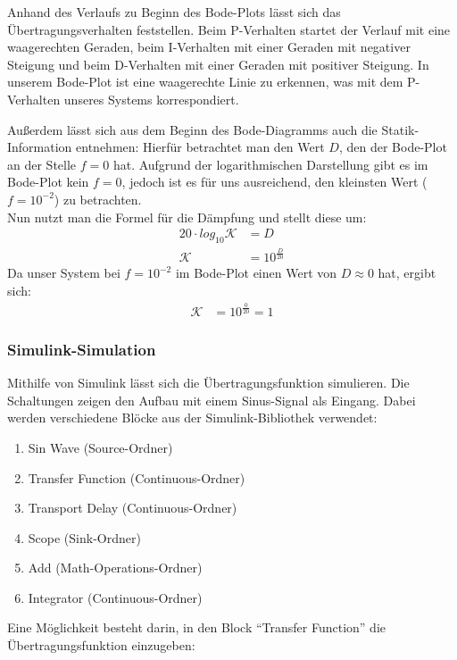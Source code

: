  Anhand des Verlaufs zu Beginn des Bode-Plots lässt sich das Übertragungsverhalten feststellen. Beim P-Verhalten startet der Verlauf mit eine waagerechten Geraden, beim I-Verhalten mit einer Geraden mit negativer Steigung und beim D-Verhalten mit einer Geraden mit positiver Steigung. 
 In unserem Bode-Plot ist eine waagerechte Linie zu erkennen, was mit dem P-Verhalten unseres Systems korrespondiert.

 Außerdem lässt sich aus dem Beginn des Bode-Diagramms auch die Statik-Information entnehmen: Hierfür betrachtet man den Wert $D$, den der Bode-Plot an der Stelle $f = 0$ hat. Aufgrund der logarithmischen Darstellung gibt es im Bode-Plot kein $f = 0$, jedoch ist es für uns ausreichend, den kleinsten Wert ($f = 10^{-2}$) zu betrachten. \\
 Nun nutzt man die Formel für die Dämpfung und stellt diese um:
 \begin{align*}
    20 \cdot log_{10} \mathcal{K} &= D \\
    \mathcal{K} &= 10^{\frac{D}{20}}
 \end{align*}
 Da unser System bei $f = 10^{-2}$ im Bode-Plot einen Wert von $D \approx 0$ hat, ergibt sich:
 \begin{align*}
    \mathcal{K} &= 10^{\frac{0}{20}} = 1
\end{align*}

\subsubsection{Simulink-Simulation}
Mithilfe von Simulink lässt sich die Übertragungsfunktion simulieren. Die Schaltungen zeigen den Aufbau mit einem Sinus-Signal als Eingang.
Dabei werden verschiedene Blöcke aus der Simulink-Bibliothek verwendet:
\begin{enumerate}
    \item Sin Wave (Source-Ordner)
    \item Transfer Function (Continuous-Ordner)
    \item Transport Delay (Continuous-Ordner)
    \item Scope (Sink-Ordner)
    \item Add (Math-Operations-Ordner)
    \item Integrator (Continuous-Ordner)
\end{enumerate}

Eine Möglichkeit besteht darin, in den Block \enquote{Transfer Function} die Übertragungsfunktion einzugeben:

